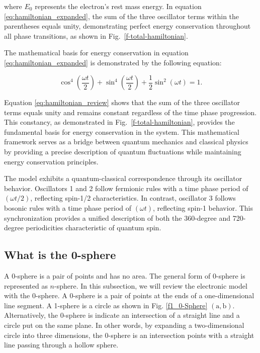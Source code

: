 \documentclass[%
 reprint,
 amsmath,amssymb,
 aps,
]{revtex4-1}
\numberwithin{equation}{section}%
\begin{document}
where $E_0$ represents the electron's rest mass energy. In equation \ref{eq:hamiltonian_expanded}, the sum of the three oscillator terms within the parentheses equals unity, demonstrating perfect energy conservation throughout all phase transitions, as shown in Fig.~\ref{f-total-hamiltonian}.

The mathematical basis for energy conservation in equation \ref{eq:hamiltonian_expanded} is demonstrated by the following equation:

\begin{equation}
    \cos^4\left(\frac{\omega t}{2}\right) + \sin^4\left(\frac{\omega t}{2}\right) + \frac{1}{2}\sin^2\left(\omega t\right) = 1.
    \label{eq:hamiltonian_review}
\end{equation}

Equation \ref{eq:hamiltonian_review} shows that the sum of the three oscillator terms equals unity and remains constant regardless of the time phase progression. This constancy, as demonstrated in Fig.~\ref{f-total-hamiltonian}, provides the fundamental basis for energy conservation in the system. This mathematical framework serves as a bridge between quantum mechanics and classical physics by providing a precise description of quantum fluctuations while maintaining energy conservation principles.

The model exhibits a quantum-classical correspondence through its oscillator behavior. Oscillators 1 and 2 follow fermionic rules with a time phase period of $(\omega t/2)$, reflecting spin-1/2 characteristics. In contrast, oscillator 3 follows bosonic rules with a time phase period of $(\omega t)$, reflecting spin-1 behavior. This synchronization provides a unified description of both the 360-degree and 720-degree periodicities characteristic of quantum spin.


\subsection{What is the 0-sphere}
\label{What is the 0-sphere}

A 0-sphere is a pair of points and has no area. The general form of 0-sphere is represented as $n$-sphere. In this subsection, we will review the electronic model with the 0-sphere. A 0-sphere is a pair of points at the ends of a one-dimensional line segment. A 1-sphere is a circle as shown in Fig. \ref{f1_0-Sphere} $(\bm{\mathrm{a}}, \bm{\mathrm{b}})$. Alternatively, the 0-sphere is indicate an intersection of a straight line and a circle put on the same plane. In other words, by expanding a two-dimensional circle into three dimensions, the 0-sphere is an intersection points with a straight line passing through a hollow sphere.
\end{document}
